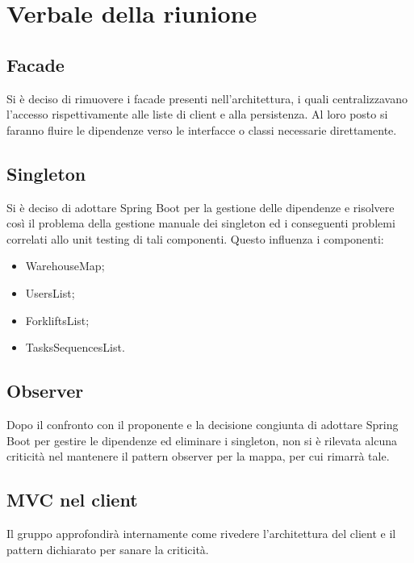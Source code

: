 \section{Verbale della riunione}

\subsection{Facade}
    Si è deciso di rimuovere i facade presenti nell'architettura, i quali centralizzavano l'accesso rispettivamente alle liste di client e alla persistenza. Al loro posto si faranno fluire le dipendenze verso le interfacce o classi necessarie direttamente.

\subsection{Singleton}
    Si è deciso di adottare Spring Boot per la gestione delle dipendenze e risolvere così il problema della gestione manuale dei singleton ed i conseguenti problemi correlati allo unit testing di tali componenti.
    Questo influenza i componenti:
    \begin{itemize}
        \item WarehouseMap;
        \item UsersList;
        \item ForkliftsList;
        \item TasksSequencesList.
    \end{itemize}

\subsection{Observer}
    Dopo il confronto con il proponente e la decisione congiunta di adottare Spring Boot per gestire le dipendenze ed eliminare i singleton, non si è rilevata alcuna criticità nel mantenere il pattern observer per la mappa, per cui rimarrà tale.

\subsection{MVC nel client}
    Il gruppo approfondirà internamente come rivedere l'architettura del client e il pattern dichiarato per sanare la criticità.

